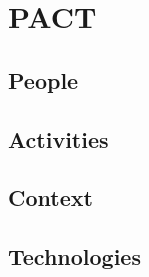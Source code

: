 \section{PACT} \label{sec:pact}

\subsection{People}

\subsection{Activities}

\subsection{Context}

\subsection{Technologies}